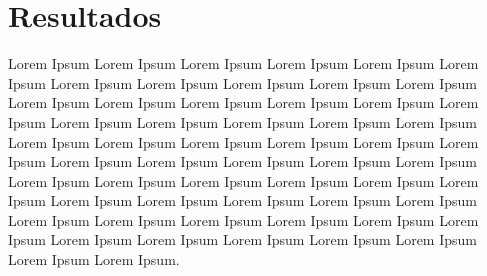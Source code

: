 \chapter{Resultados}\label{resultados}

Lorem Ipsum Lorem Ipsum Lorem Ipsum Lorem Ipsum Lorem Ipsum Lorem Ipsum Lorem Ipsum Lorem Ipsum Lorem Ipsum Lorem Ipsum Lorem Ipsum Lorem Ipsum Lorem Ipsum Lorem Ipsum Lorem Ipsum Lorem Ipsum Lorem Ipsum Lorem Ipsum Lorem Ipsum Lorem Ipsum Lorem Ipsum Lorem Ipsum Lorem Ipsum Lorem Ipsum Lorem Ipsum Lorem Ipsum Lorem Ipsum Lorem Ipsum Lorem Ipsum Lorem Ipsum Lorem Ipsum Lorem Ipsum Lorem Ipsum Lorem Ipsum Lorem Ipsum Lorem Ipsum Lorem Ipsum Lorem Ipsum Lorem Ipsum Lorem Ipsum Lorem Ipsum Lorem Ipsum Lorem Ipsum Lorem Ipsum Lorem Ipsum Lorem Ipsum Lorem Ipsum Lorem Ipsum Lorem Ipsum Lorem Ipsum Lorem Ipsum Lorem Ipsum Lorem Ipsum Lorem Ipsum Lorem Ipsum Lorem Ipsum Lorem Ipsum.



